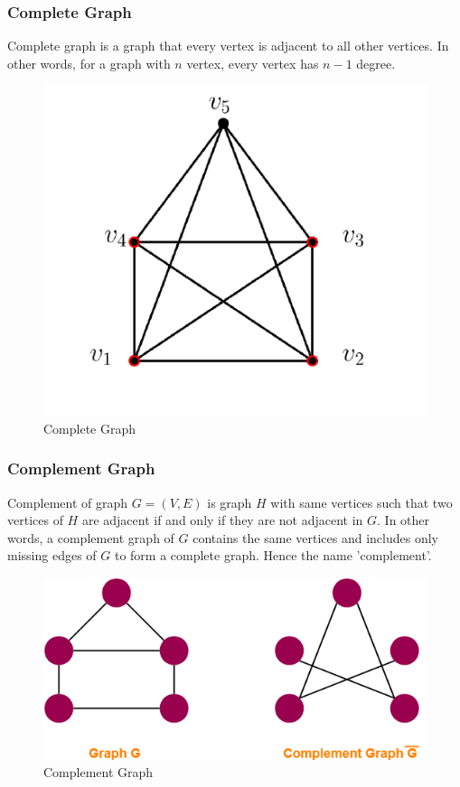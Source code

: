 \documentclass{article}
\theoremstyle{plain}%
\theoremstyle{definition}
\theoremstyle{remark}
\begin{document}
	\subsubsection{Complete Graph}

	Complete graph is a graph that every vertex is adjacent to all other vertices. In other words, for a graph with $n$ vertex, every vertex has $n-1$ degree.

	\begin{figure}[htbp]
		\center
		\includegraphics[scale=0.3]{img/complete-graph.png}
		\caption{Complete Graph}
		\label{fig-complete-graph}
	\end{figure}

	\subsubsection{Complement Graph}

	Complement of graph $G = (V, E)$ is graph $H$ with same vertices such that two vertices of $H$ are adjacent if and only if they are not adjacent in $G$. In other words, a complement graph of $G$ contains the same vertices and includes only missing edges of $G$ to form a complete graph. Hence the name 'complement'.

	\begin{figure}[htbp]
		\center
		\includegraphics[scale=0.3]{img/complement-graph.png}
		\caption{Complement Graph}
		\label{fig-complement}
	\end{figure}
\end{document}
